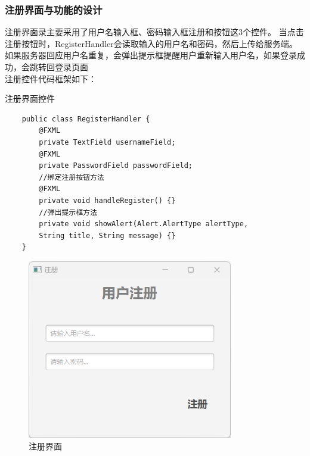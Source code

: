 \documentclass[utf8]{article}
\begin{document}
\subsubsection{注册界面与功能的设计}
注册界面录主要采用了用户名输入框、密码输入框注册和按钮这3个控件。
当点击注册按钮时，RegisterHandler会读取输入的用户名和密码，然后上传给服务端。
如果服务器回应用户名重复，会弹出提示框提醒用户重新输入用户名，如果登录成功，会跳转回登录页面\\
注册控件代码框架如下：
\begin{listing}[htb]
    \caption{注册界面控件}
    \begin{verbatim}
    public class RegisterHandler {
        @FXML 
        private TextField usernameField;
        @FXML 
        private PasswordField passwordField;
        //绑定注册按钮方法
        @FXML
        private void handleRegister() {}
        //弹出提示框方法
        private void showAlert(Alert.AlertType alertType, 
        String title, String message) {}
    }
    \end{verbatim}
\end{listing}
\begin{figure}[H]
    \centering
    \includegraphics[width=0.8\textwidth]{pictures/6}
    \caption{注册界面}
\end{figure}
\end{document}
